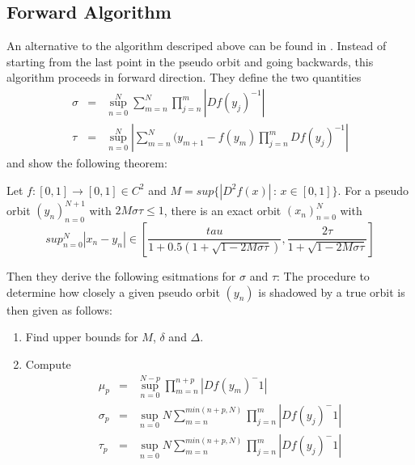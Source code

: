     \subsection{Forward Algorithm}
    An alternative to the algorithm descriped above can be found in \cite{chow1991}.
    Instead of starting from the last point in the pseudo orbit and going backwards, this algorithm proceeds in forward direction.
    They define the two quantities
    \begin{eqnarray*}
    \sigma & = & \sup^N_{n=0} \sum_{m=n}^N  \prod_{j=n}^{m} | Df(y_j)^{-1} |  \\
    \tau & = & \sup^N_{n=0} | \sum_{m=n}^N (y_{m+1}-f(y_m)\prod_{j=n}^{m} Df(y_j)^{-1}  |
    \end{eqnarray*}
    and show the following theorem:
    \begin{theorem}
    Let $f: [0,1] \to [0,1] \in C^2$ and $M = sup \{|D^2f(x)| \,:\, x \in [0,1] \}$.
    For a pseudo orbit $(y_n)_{n=0}^{N+1}$ with $2M\sigma\tau \leq 1$, there is an exact orbit $(x_n)_{n=0}^N$  with 
    $$sup_{n=0}^N |x_n - y_n| \in [\frac{tau}{1+0.5(1+\sqrt{1-2M\sigma \tau})}, \frac{2\tau}{1+\sqrt {1-2M\sigma \tau}}]$$
    \end{theorem}
    Then they derive the following esitmations for $\sigma$ and $\tau$:
    The procedure to determine how closely a given pseudo orbit $(y_n)$ is shadowed by a true orbit is then given as follows:
    \begin{enumerate}
      \item Find upper bounds for $M$, $\delta$ and $\Delta$.
      \item Compute 
      \begin{eqnarray*}
      \mu_p &=& \sup_{n=0}^{N-p} \prod_{m=n}^{n+p} |Df(y_m)^-1| \\
      \sigma_p &=& \sup_{n=0}{N} \sum_{m=n}^{min(n+p,N)} \prod_{j=n}^{m} |Df(y_j)^-1| \\
      \tau_p &=& \sup_{n=0}{N} \sum_{m=n}^{min(n+p,N)} \prod_{j=n}^{m} |Df(y_j)^-1| \\
      \end{eqnarray*}
    \end{enumerate}
